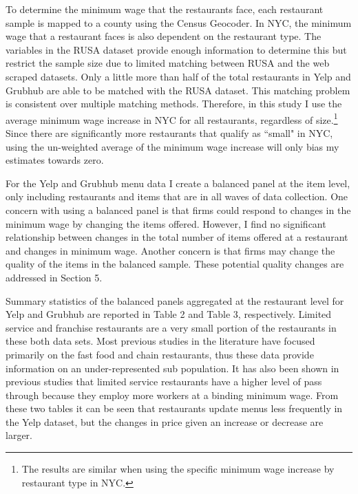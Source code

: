 \documentclass[11pt]{article}
\begin{document}
To determine the minimum wage that the restaurants face, each restaurant sample is mapped to a county using the Census Geocoder. In NYC, the minimum wage that a restaurant faces is also dependent on the restaurant type. The variables in the RUSA dataset provide enough information to determine this but restrict the sample size due to limited matching between RUSA and the web scraped datasets. Only a little more than half of the total restaurants in Yelp and Grubhub are able to be matched with the RUSA dataset. This matching problem is consistent over multiple matching methods. Therefore, in this study I use the average minimum wage increase in NYC for all restaurants, regardless of size.\footnote{The results are similar when using the specific minimum wage increase by restaurant type in NYC.} Since there are significantly more restaurants that qualify as ``small" in NYC, using the un-weighted average of the minimum wage increase will only bias my estimates towards zero. 

For the Yelp and Grubhub menu data I create a balanced panel at the item level, only including restaurants and items that are in all waves of data collection. One concern with using a balanced panel is that firms could respond to changes in the minimum wage by changing the items offered. However, I find no significant relationship between changes in the total number of items offered at a restaurant and changes in minimum wage. Another concern is that firms may change the quality of the items in the balanced sample. These potential quality changes are addressed in Section 5. 

Summary statistics of the balanced panels aggregated at the restaurant level for Yelp and Grubhub are reported in Table 2 and Table 3, respectively. Limited service and franchise restaurants are a very small portion of the restaurants in these both data sets. Most previous studies in the literature have focused primarily on the fast food and chain restaurants, thus these data provide information on an under-represented sub population. It has also been shown in previous studies that limited service restaurants have a higher level of pass through because they employ more workers at a binding minimum wage. From these two tables it can be seen that restaurants update menus less frequently in the Yelp dataset, but the changes in price given an increase or decrease are larger. 

\end{document}

